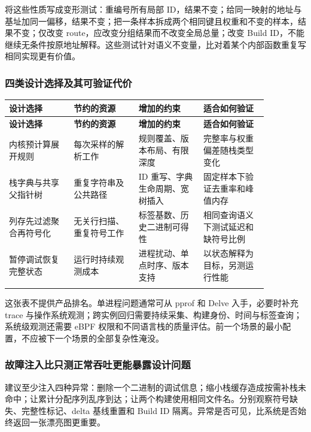 \documentclass[UTF8,fontset=fandol,openany,11pt]{ctexbook}
\begin{document}
将这些性质写成变形测试：重编号所有局部 ID，结果不变；给同一映射的地址与基址加同一偏移，结果不变；把一条样本拆成两个相同键且权重和不变的样本，结果不变；仅改变 route，应改变分组结果而不改变全局总量；改变 Build ID，不能继续无条件按原地址解释。这些测试针对语义不变量，比对着某个内部函数重复写相同实现更有价值。

\subsubsection{四类设计选择及其可验证代价}
\begingroup\small\setlength{\tabcolsep}{4pt}
\begin{longtable}{>{\raggedright\arraybackslash}p{0.215\linewidth}>{\raggedright\arraybackslash}p{0.215\linewidth}>{\raggedright\arraybackslash}p{0.215\linewidth}>{\raggedright\arraybackslash}p{0.215\linewidth}}
\toprule
\textbf{设计选择} & \textbf{节约的资源} & \textbf{增加的约束} & \textbf{适合如何验证} \\
\midrule
\endfirsthead
\toprule
\textbf{设计选择} & \textbf{节约的资源} & \textbf{增加的约束} & \textbf{适合如何验证} \\
\midrule
\endhead
内核预计算展开规则 & 每次采样的解析工作 & 规则覆盖、版本布局、有限深度 & 完整率与权重偏差随栈类型变化 \\
\addlinespace[3pt]
栈字典与共享父指针树 & 重复字符串及公共路径 & ID 重写、字典生命周期、宽树插入 & 固定样本下验证去重率和峰值内存 \\
\addlinespace[3pt]
列存先过滤聚合再符号化 & 无关行扫描、重复符号工作 & 标签基数、历史二进制可得性 & 相同查询语义下测试延迟和缺符号比例 \\
\addlinespace[3pt]
暂停调试恢复完整状态 & 运行时持续观测成本 & 进程扰动、单点时序、版本支持 & 以状态解释为目标，另测运行性能 \\
\addlinespace[3pt]
\bottomrule
\end{longtable}
\endgroup
这张表不提供产品排名。单进程问题通常可从 pprof 和 Delve 入手，必要时补充 trace 与操作系统观测；跨实例回归需要持续采集、构建身份、时间与标签查询；系统级观测还需要 eBPF 权限和不同语言栈的质量评估。前一个场景的最小配置，不应被下一个场景的全部复杂性淹没。

\subsubsection{故障注入比只测正常吞吐更能暴露设计问题}
建议至少注入四种异常：删除一个二进制的调试信息；缩小栈缓存造成按需补栈未命中；让累计分配序列乱序到达；让两个构建使用相同文件名。分别观察符号缺失、完整性标记、delta 基线重置和 Build ID 隔离。异常是否可见，比系统是否始终返回一张漂亮图更重要。
\end{document}

